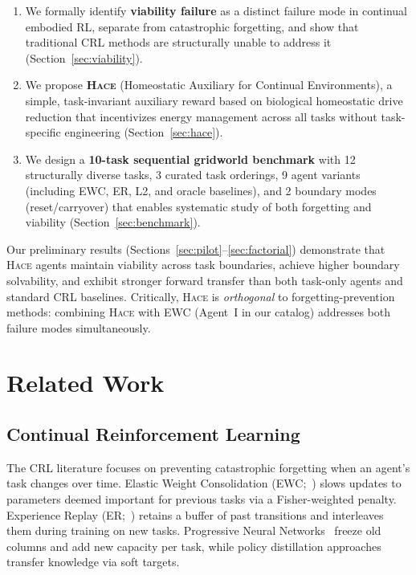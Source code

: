 \documentclass{article}
\newcommand{\hace}{\textsc{Hace}}
\begin{document}
\begin{enumerate}[leftmargin=*,topsep=2pt,itemsep=1pt]
  \item We formally identify \textbf{viability failure} as a distinct failure
        mode in continual embodied RL, separate from catastrophic forgetting,
        and show that traditional CRL methods are structurally unable to
        address it (Section~\ref{sec:viability}).

  \item We propose \textbf{\hace{}} (Homeostatic Auxiliary for Continual
        Environments), a simple, task-invariant auxiliary reward based on
        biological homeostatic drive reduction that incentivizes energy
        management across all tasks without task-specific
        engineering (Section~\ref{sec:hace}).

  \item We design a \textbf{10-task sequential gridworld benchmark} with
        12 structurally diverse tasks, 3 curated task orderings, 9 agent
        variants (including EWC, ER, L2, and oracle baselines), and 2
        boundary modes (reset/carryover) that enables systematic study of
        both forgetting and viability (Section~\ref{sec:benchmark}).
\end{enumerate}

Our preliminary results (Sections~\ref{sec:pilot}--\ref{sec:factorial})
demonstrate that \hace{} agents maintain viability across task boundaries,
achieve higher boundary solvability, and exhibit stronger forward transfer
than both task-only agents and standard CRL baselines. Critically, \hace{}
is \emph{orthogonal} to forgetting-prevention methods: combining \hace{}
with EWC (Agent~I in our catalog) addresses both failure modes
simultaneously.

\section{Related Work}
\label{sec:related}

\subsection{Continual Reinforcement Learning}

The CRL literature focuses on preventing catastrophic forgetting when an
agent's task changes over time. Elastic Weight Consolidation
(EWC;~\cite{kirkpatrick2017}) slows updates to parameters deemed important
for previous tasks via a Fisher-weighted penalty. Experience Replay
(ER;~\cite{rolnick2019}) retains a buffer of past transitions and
interleaves them during training on new tasks. Progressive Neural
Networks~\cite{rusu2016} freeze old columns and add new capacity per task,
while policy distillation approaches~\cite{rusu2015} transfer knowledge
via soft targets.
\end{document}

